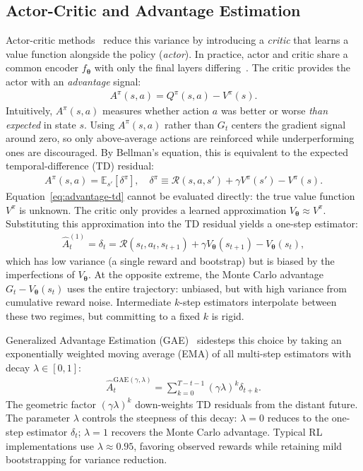 \subsection{Actor-Critic and Advantage Estimation}

Actor-critic methods~\cite{kondaOnActorCriticAlgorithms2003} reduce this variance by introducing a \emph{critic} that learns a value function alongside the policy (\emph{actor}). In practice, actor and critic share a common encoder $f_{\boldsymbol{\theta}}$ with only the final layers differing~\cite{mnihAsynchronousMethodsDeep2016}. The critic provides the actor with an \emph{advantage} signal:
\begin{align}
A^\pi(s,a) = Q^\pi(s,a) - V^\pi(s).
\label{eq:advantage}
\end{align}
Intuitively, $A^\pi(s,a)$ measures whether action $a$ was better or worse \emph{than expected} in state $s$. Using $A^\pi(s,a)$ rather than $G_t$ centers the gradient signal around zero, so only above-average actions are reinforced while underperforming ones are discouraged. By Bellman's equation, this is equivalent to the expected temporal-difference (TD) residual:
\begin{align}
A^\pi(s,a) = \mathbb{E}_{s'}\!\left[\delta^\pi\right], 
\quad \delta^\pi \equiv \mathcal{R}(s,a,s') + \gamma V^\pi(s') - V^\pi(s).
\label{eq:advantage-td}
\end{align}
Equation~\ref{eq:advantage-td} cannot be evaluated directly: the true value function $V^\pi$ is unknown. The critic only provides a learned approximation $V_{\boldsymbol{\theta}} \approx V^\pi$. Substituting this approximation into the TD residual yields a one-step estimator:
\begin{align}
\hat{A}_t^{(1)} = \delta_t = \mathcal{R}(s_t, a_t, s_{t+1}) + \gamma V_{\boldsymbol{\theta}}(s_{t+1}) - V_{\boldsymbol{\theta}}(s_t),
\end{align}
which has low variance (a single reward and bootstrap) but is biased by the imperfections of $V_{\boldsymbol{\theta}}$. At the opposite extreme, the Monte Carlo advantage $G_t - V_{\boldsymbol{\theta}}(s_t)$ uses the 
entire trajectory: unbiased, but with high variance from cumulative reward noise. Intermediate $k$-step estimators interpolate between these two regimes, but committing to a fixed $k$ is rigid.

Generalized Advantage Estimation (GAE)~\cite{schulmanHighDimensionalContinuousControl2015} sidesteps this choice by taking an exponentially weighted moving average (EMA) of all multi-step estimators with decay $\lambda \in [0,1]$:
\begin{align}
\hat{A}_t^{\text{GAE}(\gamma,\lambda)} = \sum_{k=0}^{T-t-1} (\gamma \lambda)^k \delta_{t+k}.
\label{eq:gae}
\end{align}
The geometric factor $(\gamma\lambda)^k$ down-weights TD residuals from the distant future. The parameter $\lambda$ controls the steepness of this decay: $\lambda = 0$ reduces to the one-step estimator $\delta_t$; $\lambda = 1$ recovers the Monte Carlo advantage. Typical RL implementations use $\lambda \approx 0.95$, favoring observed rewards while retaining mild bootstrapping for variance reduction.


